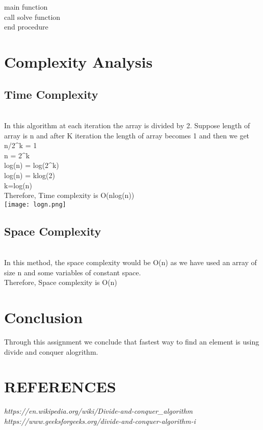 \documentclass[conference]{IEEEtran}
\begin{document}
main function \\
\indent \hspace{0.5 cm} call solve function \\ 
end procedure

\section{Complexity Analysis}

\subsection{Time Complexity}\\
In this algorithm at each iteration the array is divided by 2. Suppose length of array is n and after K iteration the length of array becomes 1 and then we get\\
n/2^{k} = 1\\
n = 2^{k}\\
log(n) = log(2^{k})\\
log(n) = klog(2)\\
k=log(n)\\

Therefore, Time complexity is O(nlog(n))\\

\texttt{[image: logn.png]}

\subsection{Space Complexity}\\
In this method, the space complexity would be O(n) as we have used an array of size n and some variables of constant space.  \\

Therefore, Space complexity is O(n)\\

\section{Conclusion}
Through this assignment we conclude that fastest way to find an element is using divide and conquer alogrithm.
\section{REFERENCES}
\textit{https://en.wikipedia.org/wiki/Divide-and-conquer_algorithm }\\
\textit{https://www.geeksforgeeks.org/divide-and-conquer-algorithm-i}\\
\end{document}
